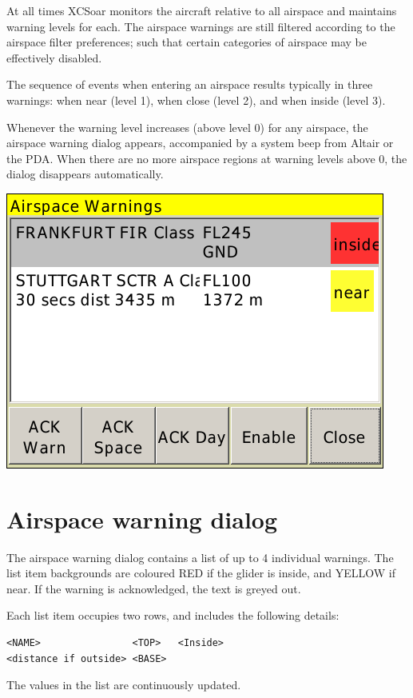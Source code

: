 \documentclass[a4paper,12pt]{refrep}
\begin{document}
At all times XCSoar monitors the aircraft relative to all airspace and
maintains warning levels for each.  The airspace warnings are still
filtered according to the airspace filter preferences; such that
certain categories of airspace may be effectively disabled.

The sequence of events when entering an airspace results typically
in three warnings: when near (level 1), when close (level 2), and when
inside (level 3).

Whenever the warning level increases (above level 0) for any airspace,
the airspace warning dialog appears, accompanied by a system beep from
Altair or the PDA.  When there are no more airspace regions at warning
levels above 0, the dialog disappears automatically.

\begin{center}
\includegraphics[angle=0,width=0.7\linewidth,keepaspectratio='true']{figures/airspacewarning_2.png}
\end{center}

\section{Airspace warning dialog}

The airspace warning dialog contains a list of up to 4 individual
warnings.  The list item backgrounds are coloured RED if the glider is
inside, and YELLOW if near.  If the warning is acknowledged, the
text is greyed out.

Each list item occupies two rows, and includes the following details:

\begin{verbatim}
<NAME>                <TOP>   <Inside>
<distance if outside> <BASE>
\end{verbatim} 

The values in the list are continuously updated. 
\end{document}
